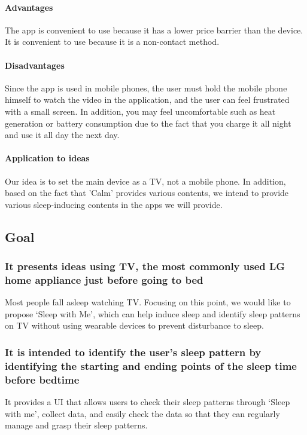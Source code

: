 \documentclass[conference]{IEEEtran}
\begin{document}
\paragraph{Advantages}
The app is convenient to use because it has a lower price barrier than the device. It is convenient to use because it is a non-contact method.
\paragraph{Disadvantages}
Since the app is used in mobile phones, the user must hold the mobile phone himself to watch the video in the application, and the user can feel frustrated with a small screen. In addition, you may feel uncomfortable such as heat generation or battery consumption due to the fact that you charge it all night and use it all day the next day.
\paragraph{Application to ideas}
Our idea is to set the main device as a TV, not a mobile phone. In addition, based on the fact that 'Calm' provides various contents, we intend to provide various sleep-inducing contents in the apps we will provide.
\vspace{1\baselineskip}
\subsection{Goal}
\subsubsection{It presents ideas using TV, the most commonly used LG home appliance just before going to bed}
Most people fall asleep watching TV. Focusing on this point, we would like to propose ‘Sleep with Me’, which can help induce sleep and identify sleep patterns on TV without using wearable devices to prevent disturbance to sleep.
\vspace{1\baselineskip}
\subsubsection{It is intended to identify the user's sleep pattern by identifying the starting and ending points of the sleep time before bedtime}
It provides a UI that allows users to check their sleep patterns through ‘Sleep with me’, collect data, and easily check the data so that they can regularly manage and grasp their sleep patterns.
\vspace{1\baselineskip}
\end{document}
